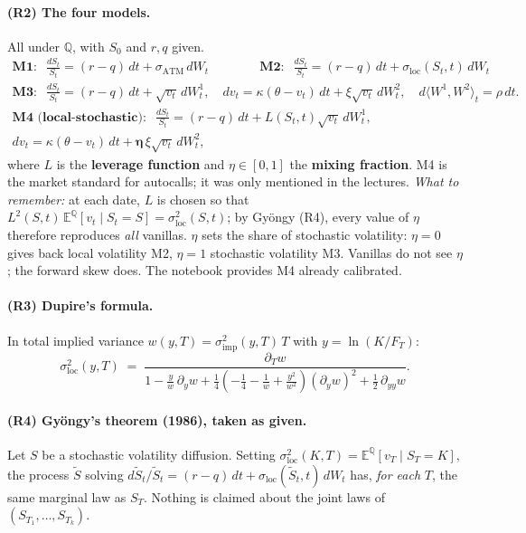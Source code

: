 \documentclass[11pt,a4paper]{article}
\newcommand{\E}{\mathbb{E}^{\mathbb{Q}}}
\begin{document}
\paragraph{(R2) The four models.} All under $\mathbb{Q}$, with $S_0$ and $r, q$ given.
\begin{gather*}
  \textbf{M1}:\;\; \frac{dS_t}{S_t} = (r-q)\,dt + \sigma_{\mathrm{ATM}}\, dW_t
  \qquad\qquad
  \textbf{M2}:\;\; \frac{dS_t}{S_t} = (r-q)\,dt + \sigma_{\mathrm{loc}}(S_t,t)\, dW_t \\[0.6em]
  \textbf{M3}:\;\; \frac{dS_t}{S_t} = (r-q)\,dt + \sqrt{v_t}\, dW^1_t, \quad
  dv_t = \kappa(\theta - v_t)\,dt + \xi\sqrt{v_t}\, dW^2_t, \quad
  d\langle W^1, W^2\rangle_t = \rho\, dt. \\[0.6em]
  \textbf{M4 (local-stochastic)}:\;\; \frac{dS_t}{S_t} = (r-q)\,dt + L(S_t,t)\sqrt{v_t}\, dW^1_t, \\
  dv_t = \kappa(\theta - v_t)\,dt + \boldsymbol{\eta}\,\xi\sqrt{v_t}\, dW^2_t,
\end{gather*}
where $L$ is the \textbf{leverage function} and $\eta \in [0,1]$ the \textbf{mixing fraction}. M4 is the market standard for
autocalls; it was only mentioned in the lectures. \emph{What to remember:} at each date, $L$ is chosen so that
$L^2(S,t)\,\E[v_t \mid S_t = S] = \sigma^2_{\mathrm{loc}}(S,t)$; by Gyöngy (R4), every value of $\eta$ therefore reproduces \emph{all} vanillas.
$\eta$ sets the share of stochastic volatility: $\eta = 0$ gives back local volatility M2, $\eta = 1$ stochastic volatility
M3. Vanillas do not see $\eta$; the forward skew does. The notebook provides M4 already calibrated.

\paragraph{(R3) Dupire's formula.} In total implied variance $w(y,T) = \sigma^2_{\mathrm{imp}}(y,T)\,T$ with $y = \ln(K/F_T)$:
\[
  \sigma^2_{\mathrm{loc}}(y,T) \;=\;
  \frac{\partial_T w}
  {1 - \frac{y}{w}\,\partial_y w + \frac{1}{4}\left(-\frac{1}{4} - \frac{1}{w} + \frac{y^2}{w^2}\right)(\partial_y w)^2 + \frac{1}{2}\,\partial_{yy} w}.
\]

\paragraph{(R4) Gyöngy's theorem (1986), taken as given.} Let $S$ be a stochastic volatility diffusion.
Setting $\sigma^2_{\mathrm{loc}}(K,T) = \E[v_T \mid S_T = K]$, the process $\widetilde S$ solving $d\widetilde S_t/\widetilde S_t = (r-q)\,dt + \sigma_{\mathrm{loc}}(\widetilde S_t, t)\,dW_t$ has,
\emph{for each} $T$, the same marginal law as $S_T$. Nothing is claimed about the joint laws of $(S_{T_1},\ldots,S_{T_k})$.
\end{document}
